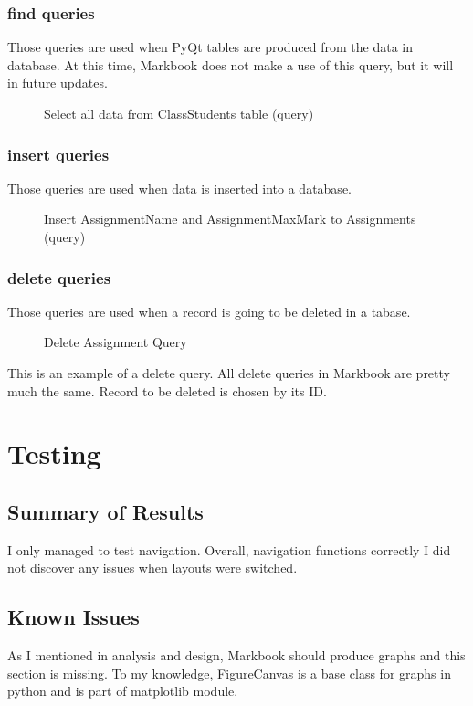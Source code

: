 \subsubsection{find queries}
Those queries are used when PyQt tables are produced from the data in database. 
At this time, Markbook does not make a use of this query, but it will in future updates.
\begin{figure}[H]
    \caption{Select all data from ClassStudents table (query)} \label{}
\end{figure}

\subsubsection{insert queries}
Those queries are used when data is inserted into a database.
 
\begin{figure}[H]
    \caption{Insert AssignmentName and AssignmentMaxMark to Assignments (query)} \label{}
\end{figure}

\subsubsection{delete queries}
Those queries are used when a record is going to be deleted in a tabase.
\begin{figure}[H]
    \caption{Delete Assignment Query} \label{}
\end{figure}
This is an example of a delete query. All delete queries in Markbook are pretty much the same.
Record to be deleted is chosen by its ID. 

\section{Testing}
\subsection{Summary of Results}
I only managed to test navigation. Overall, navigation functions correctly I did not discover any issues when layouts were switched.

\subsection{Known Issues}
As I mentioned in analysis and design, Markbook should produce graphs and this section is missing. To my knowledge, FigureCanvas is a base class for graphs in python and is part of matplotlib module.

